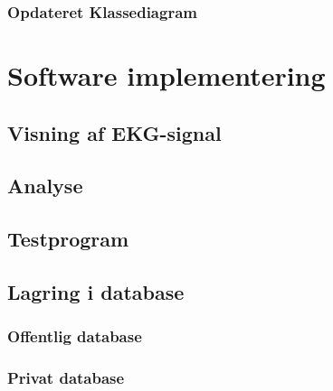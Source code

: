 \subsubsection{Opdateret Klassediagram}

\section{Software implementering}
 
\subsection{Visning af EKG-signal}

\subsection{Analyse}

\subsection{Testprogram}

\subsection{Lagring i database} 

\subsubsection{Offentlig database}

\subsubsection{Privat database}







